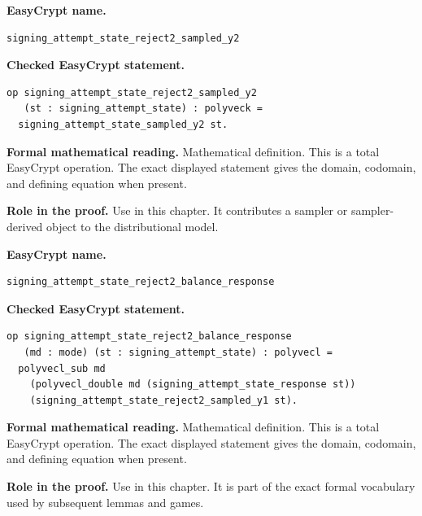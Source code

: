 \begin{formaldefinition}
\noindent\textbf{EasyCrypt name.}
\begin{lstlisting}[language=EasyCrypt,basicstyle=\ttfamily\scriptsize]
signing_attempt_state_reject2_sampled_y2
\end{lstlisting}
\noindent\textbf{Checked EasyCrypt statement.}
\begin{lstlisting}[language=EasyCrypt,basicstyle=\ttfamily\scriptsize]
op signing_attempt_state_reject2_sampled_y2
   (st : signing_attempt_state) : polyveck =
  signing_attempt_state_sampled_y2 st.
\end{lstlisting}
\noindent\textbf{Formal mathematical reading.}
Mathematical definition. This is a total EasyCrypt operation.  The exact displayed statement gives the domain, codomain, and defining equation when present.

\noindent\textbf{Role in the proof.}
Use in this chapter. It contributes a sampler or sampler-derived object to the distributional model.

\end{formaldefinition}

\begin{formaldefinition}
\noindent\textbf{EasyCrypt name.}
\begin{lstlisting}[language=EasyCrypt,basicstyle=\ttfamily\scriptsize]
signing_attempt_state_reject2_balance_response
\end{lstlisting}
\noindent\textbf{Checked EasyCrypt statement.}
\begin{lstlisting}[language=EasyCrypt,basicstyle=\ttfamily\scriptsize]
op signing_attempt_state_reject2_balance_response
   (md : mode) (st : signing_attempt_state) : polyvecl =
  polyvecl_sub md
    (polyvecl_double md (signing_attempt_state_response st))
    (signing_attempt_state_reject2_sampled_y1 st).
\end{lstlisting}
\noindent\textbf{Formal mathematical reading.}
Mathematical definition. This is a total EasyCrypt operation.  The exact displayed statement gives the domain, codomain, and defining equation when present.

\noindent\textbf{Role in the proof.}
Use in this chapter. It is part of the exact formal vocabulary used by subsequent lemmas and games.

\end{formaldefinition}

